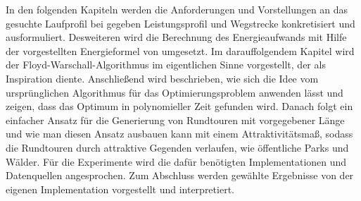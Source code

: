 \documentclass[12pt]{article}
\begin{document}
In den folgenden Kapiteln werden die Anforderungen und Vorstellungen an das gesuchte Laufprofil bei gegeben Leistungsprofil und Wegstrecke konkretisiert und ausformuliert. Desweiteren wird die Berechnung des Energieaufwands mit Hilfe der vorgestellten Energieformel von \cite{givoni1971} umgesetzt. Im darauffolgendem Kapitel wird der Floyd-Warschall-Algorithmus im eigentlichen Sinne vorgestellt, der als Inspiration diente. Anschließend wird beschrieben, wie sich die Idee vom ursprünglichen Algorithmus für das Optimierungsproblem anwenden lässt und zeigen, dass das Optimum in polynomieller Zeit gefunden wird. Danach folgt ein einfacher Ansatz für die Generierung von Rundtouren mit vorgegebener Länge und wie man diesen Ansatz ausbauen kann mit einem Attraktivitätsmaß, sodass die Rundtouren durch attraktive Gegenden verlaufen, wie öffentliche Parks und Wälder. Für die Experimente wird die dafür benötigten Implementationen und Datenquellen angesprochen. Zum Abschluss werden gewählte Ergebnisse von der eigenen Implementation vorgestellt und interpretiert.
\end{document}
